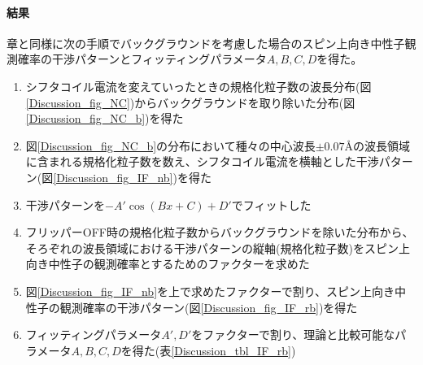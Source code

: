 \paragraph{結果}
章と同様に次の手順でバックグラウンドを考慮した場合のスピン上向き中性子観測確率の干渉パターンとフィッティングパラメータ$A,B,C,D$を得た。
\begin{enumerate}
\item シフタコイル電流を変えていったときの規格化粒子数の波長分布(図\ref{Discussion_fig_NC})からバックグラウンドを取り除いた分布(図\ref{Discussion_fig_NC_b})を得た
\item 図\ref{Discussion_fig_NC_b}の分布において種々の中心波長$\pm0.07$\AA の波長領域に含まれる規格化粒子数を数え、シフタコイル電流を横軸とした干渉パターン(図\ref{Discussion_fig_IF_nb})を得た
\item 干渉パターンを$-A'\cos(Bx+C)+D'$でフィットした
\item フリッパーOFF時の規格化粒子数からバックグラウンドを除いた分布から、そろぞれの波長領域における干渉パターンの縦軸(規格化粒子数)をスピン上向き中性子の観測確率とするためのファクターを求めた
\item 図\ref{Discussion_fig_IF_nb}を上で求めたファクターで割り、スピン上向き中性子の観測確率の干渉パターン(図\ref{Discussion_fig_IF_rb})を得た
\item フィッティングパラメータ$A',D'$をファクターで割り、理論と比較可能なパラメータ$A,B,C,D$を得た(表\ref{Discussion_tbl_IF_rb})
\end{enumerate}

